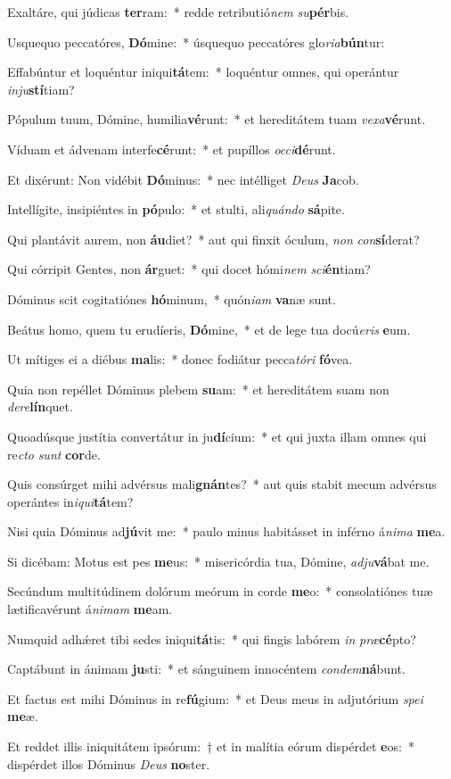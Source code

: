  \item Exaltáre, qui júdicas \textbf{ter}ram:~* redde retributió\textit{nem} \textit{su}\textbf{pér}bis.
\item Usquequo peccatóres, \textbf{Dó}mine:~* úsquequo peccatóres glo\textit{ria}\textbf{bún}tur:
\item Effabúntur et loquéntur iniqui\textbf{tá}tem:~* loquéntur omnes, qui operántur \textit{inju}\textbf{stí}tiam?
\item Pópulum tuum, Dómine, humilia\textbf{vé}runt:~* et hereditátem tuam \textit{vexa}\textbf{vé}runt.
\item Víduam et ádvenam interfe\textbf{cé}runt:~* et pupíllos \textit{occi}\textbf{dé}runt.
\item Et dixérunt: Non vidébit \textbf{Dó}minus:~* nec intélliget \textit{Deus} \textbf{Ja}cob.
\item Intellígite, insipiéntes in \textbf{pó}pulo:~* et stulti, ali\textit{quándo} \textbf{sá}pite.
\item Qui plantávit aurem, non \textbf{áu}diet?~* aut qui finxit óculum, \textit{non} \textit{con}\textbf{sí}derat?
\item Qui córripit Gentes, non \textbf{ár}guet:~* qui docet hómi\textit{nem} \textit{sci}\textbf{én}tiam?
\item Dóminus scit cogitatiónes \textbf{hó}minum,~* quón\textit{iam} \textbf{va}næ sunt.
\item Beátus homo, quem tu erudíeris, \textbf{Dó}mine,~* et de lege tua docú\hspace{0.01em}\textit{eris} \textbf{e}um.
\item Ut mítiges ei a diébus \textbf{ma}lis:~* donec fodiátur pecca\textit{tóri} \textbf{fó}vea.
\item Quia non repéllet Dóminus plebem \textbf{su}am:~* et hereditátem suam non \textit{dere}\textbf{lín}quet.
\item Quoadúsque justítia convertátur in ju\textbf{dí}cium:~* et qui juxta illam omnes qui re\textit{cto} \textit{sunt} \textbf{cor}de.
\item Quis consúrget mihi advérsus mali\textbf{gnán}tes?~* aut quis stabit mecum advérsus operántes in\textit{iqui}\textbf{tá}tem?
\item Nisi quia Dóminus ad\textbf{jú}vit me:~* paulo minus habitásset in inférno á\textit{nima} \textbf{me}a.
\item Si dicébam: Motus est pes \textbf{me}us:~* misericórdia tua, Dómine, \textit{adju}\textbf{vá}bat me.
\item Secúndum multitúdinem dolórum meórum in corde \textbf{me}o:~* consolatiónes tuæ lætificavérunt á\textit{nimam} \textbf{me}am.
\item Numquid adhǽret tibi sedes iniqui\textbf{tá}tis:~* qui fingis labórem \textit{in} \textit{præ}\textbf{cé}pto?
\item Captábunt in ánimam \textbf{ju}sti:~* et sánguinem innocéntem \textit{condem}\textbf{ná}bunt.
\item Et factus est mihi Dóminus in re\textbf{fú}gium:~* et Deus meus in adjutórium \textit{spei} \textbf{me}æ.
\item Et reddet illis iniquitátem i\-psórum:~† et in malítia eórum dispérdet \textbf{e}os:~* dispérdet illos Dóminus \textit{Deus} \textbf{no}ster.
